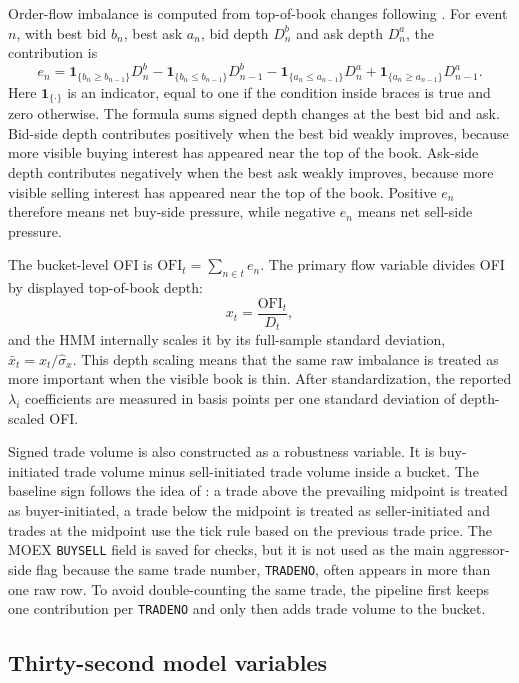 \documentclass[12pt,a4paper]{article}
\newcommand{\OFI}{\mathrm{OFI}}
\begin{document}
Order-flow imbalance is computed from top-of-book changes following \citet{ContKukanovStoikov2014}. For event \(n\), with best bid \(b_n\), best ask \(a_n\), bid depth \(D^b_n\)  and ask depth \(D^a_n\), the contribution is
\[
e_n =
\mathbf{1}_{\{b_n\ge b_{n-1}\}}D^b_n
-\mathbf{1}_{\{b_n\le b_{n-1}\}}D^b_{n-1}
-\mathbf{1}_{\{a_n\le a_{n-1}\}}D^a_n
+\mathbf{1}_{\{a_n\ge a_{n-1}\}}D^a_{n-1}.
\]
Here \(\mathbf{1}_{\{\cdot\}}\) is an indicator, equal to one if the condition inside braces is true and zero otherwise. The formula sums signed depth changes at the best bid and ask. Bid-side depth contributes positively when the best bid weakly improves, because more visible buying interest has appeared near the top of the book. Ask-side depth contributes negatively when the best ask weakly improves, because more visible selling interest has appeared near the top of the book. Positive \(e_n\) therefore means net buy-side pressure, while negative \(e_n\) means net sell-side pressure.

The bucket-level OFI is \(\OFI_t=\sum_{n\in t}e_n\). The primary flow variable divides OFI by displayed top-of-book depth:
\[
x_t=\frac{\OFI_t}{D_t},
\]
and the HMM internally scales it by its full-sample standard deviation, \(\bar{x}_t=x_t/\widehat{\sigma}_x\). This depth scaling means that the same raw imbalance is treated as more important when the visible book is thin. After standardization, the reported \(\lambda_i\) coefficients are measured in basis points per one standard deviation of depth-scaled OFI.

Signed trade volume is also constructed as a robustness variable. It is buy-initiated trade volume minus sell-initiated trade volume inside a bucket. The baseline sign follows the idea of \citet{LeeReady1991}: a trade above the prevailing midpoint is treated as buyer-initiated, a trade below the midpoint is treated as seller-initiated  and trades at the midpoint use the tick rule based on the previous trade price. The MOEX \texttt{BUYSELL} field is saved for checks, but it is not used as the main aggressor-side flag because the same trade number, \texttt{TRADENO}, often appears in more than one raw row. To avoid double-counting the same trade, the pipeline first keeps one contribution per \texttt{TRADENO} and only then adds trade volume to the bucket.

\subsection{Thirty-second model variables}\label{sec:variables_30s}
\end{document}
